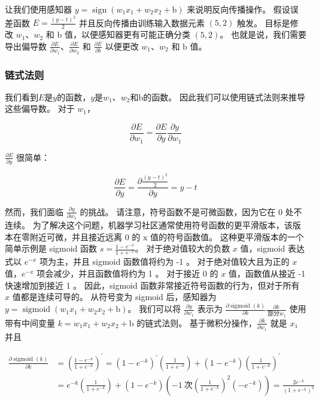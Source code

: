 让我们使用感知器 $y=\operatorname{sign}\left(w_{1} x_{1}+w_{2} x_{2}+\mathrm{b}\right)$ 来说明反向传播操作。 假设误差函数 $E=\frac{(y-t)^{2}}{2}$ 并且反向传播由训练输入数据元素 $(5,2)$ 触发。 目标是修改 $w_{1}、w_{2}$ 和 $\mathrm{b}$ 值，以便感知器更有可能正确分类 $(5,2)$。 也就是说，我们需要导出偏导数 $\frac{\partial E}{\partial w_{1}}、\frac{\partial E}{\partial w_{2}}$ 和 $\frac {\partial E}{\partial b}$ 以便更改 $w_{1}、w_{2}$ 和 $\mathrm{b}$ 值。

\subsubsection{链式法则}
我们看到$E$是$y$的函数，$y$是$w_{1}、w_{2}$和$\mathrm{b}$的函数。 因此我们可以使用链式法则来推导这些偏导数。 对于 $w_{1}$，

$$
\frac{\partial E}{\partial w_{1}}=\frac{\partial E}{\partial y} \frac{\partial y}{\partial w_{1}}
$$

$\frac{\partial E}{\partial y}$ 很简单：

$$
\frac{\partial E}{\partial y}=\frac{\partial \frac{(y-t)^{2}}{2}}{\partial y}=y-t
$$

然而，我们面临 $\frac{\partial y}{\partial w_{1}}$ 的挑战。 请注意，符号函数不是可微函数，因为它在 0 处不连续。 为了解决这个问题，机器学习社区通常使用符号函数的更平滑版本，该版本在零附近可微，并且接近远离 0 的 $\mathrm{x}$ 值的符号函数值。 这种更平滑版本的一个简单示例是 sigmoid 函数 $s=\frac{1-e^{-x}}{1+e^{-x}}$。 对于绝对值较大的负数 $x$ 值，sigmoid 表达式以 $e^{-x}$ 项为主，并且 sigmoid 函数值将约为 -1 。 对于绝对值较大且为正的 $x$ 值，$e^{-x}$ 项会减少，并且函数值将约为 1 。 对于接近 0 的 $x$ 值，函数值从接近 -1 快速增加到接近 1 。 因此，sigmoid 函数非常接近符号函数的行为，但对于所有 $x$ 值都是连续可导的。 从符号变为 sigmoid 后，感知器为 $y=\operatorname{sigmoid}\left(w_{1} x_{1}+w_{2} x_{2}+\mathrm{b}\right)$。 我们可以将 $\frac{\partial y}{\partial w_{1}}$ 表示为 $\frac{\partial \operatorname{sigmoid}(k)}{\partial k} \frac{\partial k}{\ 部分 w_{1}}$ 使用带有中间变量 $k=w_{1} x_{1}+w_{2} x_{2}+\mathrm{b}$ 的链式法则。 基于微积分操作，$\frac{\partial k}{\partial w_{1}}$ 就是 $x_{1}$ 并且

$$
\begin{aligned}
\frac{\partial \operatorname{sigmoid}(k)}{\partial k} & =\left(\frac{1-e^{-k}}{1+e^{-k}}\right)^ {\prime}=\left(1-e^{-k}\right)^{\prime}\left(\frac{1}{1+e^{-k}}\right)+\left(1 -e^{-k}\right)\left(\frac{1}{1+e^{-k}}\right)^{\prime} \\
& =e^{-k}\left(\frac{1}{1+e^{-k}}\right)+\left(1-e^{-k}\right)\left(-1 \ 次\left(\frac{1}{1+e^{-k}}\right)^{2}\left(-e^{-k}\right)\right)=\frac{2 e^{ -k}}{\left(1+e^{-k}\right)^{2}}
\end{aligned}
$$

